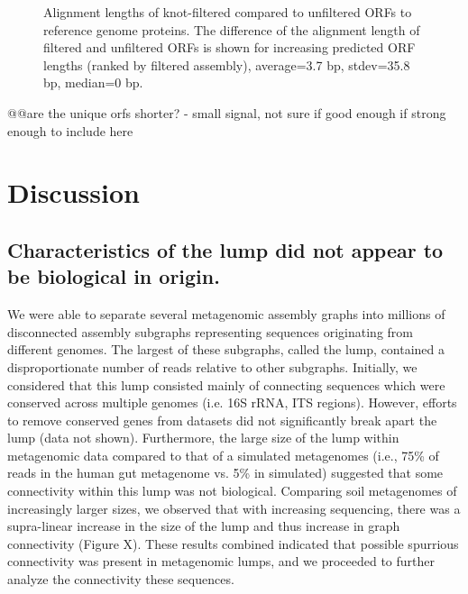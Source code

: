 \documentclass[11pt]{article} %
\begin{document}
\begin{figure}
\caption{Alignment lengths of knot-filtered compared to unfiltered ORFs to reference genome proteins.  The difference of the alignment length of filtered and unfiltered ORFs is shown for increasing predicted ORF lengths (ranked by filtered assembly), average=3.7 bp, stdev=35.8 bp, median=0 bp.}
\end{figure}


@@are the unique orfs shorter? - small signal, not sure if good enough if strong enough to include here

\section{Discussion}

\subsection{Characteristics of the lump did not appear to be biological in origin.}

We were able to separate several metagenomic assembly graphs into millions of disconnected assembly subgraphs representing sequences originating from different genomes.  The largest of these subgraphs, called the lump, contained a disproportionate number of reads relative to other subgraphs.  Initially, we considered that this lump consisted mainly of connecting sequences which were conserved across multiple genomes (i.e. 16S rRNA, ITS regions).  However, efforts to remove conserved genes from datasets did not significantly break apart the lump (data not shown).  Furthermore,  the large size of the lump within metagenomic data compared to that of a simulated metagenomes (i.e., 75\% of reads in the human gut metagenome vs. 5\% in simulated) suggested that some connectivity within this lump was not biological.  Comparing soil metagenomes of increasingly larger sizes, we observed that with increasing sequencing, there was a supra-linear increase in the size of the lump and thus increase in graph connectivity (Figure X). These results combined indicated that possible spurrious connectivity was present in metagenomic lumps, and we proceeded to further analyze the connectivity these sequences.
\end{document}
